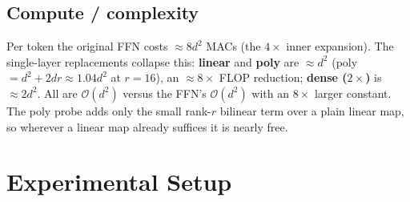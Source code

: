 \documentclass{article}
\begin{document}
\subsection{Compute / complexity}
\label{sec:compute}

Per token the original FFN costs $\approx 8d^2$ MACs (the $4\times$ inner expansion). The
single-layer replacements collapse this: \textbf{linear} and \textbf{poly} are $\approx d^2$
(poly $= d^2 + 2dr \approx 1.04 d^2$ at $r = 16$), an $\approx 8\times$ FLOP reduction;
\textbf{dense ($2\times$)} is $\approx 2d^2$. All are $\mathcal{O}(d^2)$ versus the FFN's
$\mathcal{O}(d^2)$ with an $8\times$ larger constant. The poly probe adds only the small
rank-$r$ bilinear term over a plain linear map, so wherever a linear map already suffices it
is nearly free.

\section{Experimental Setup}
\label{sec:setup}
\end{document}
